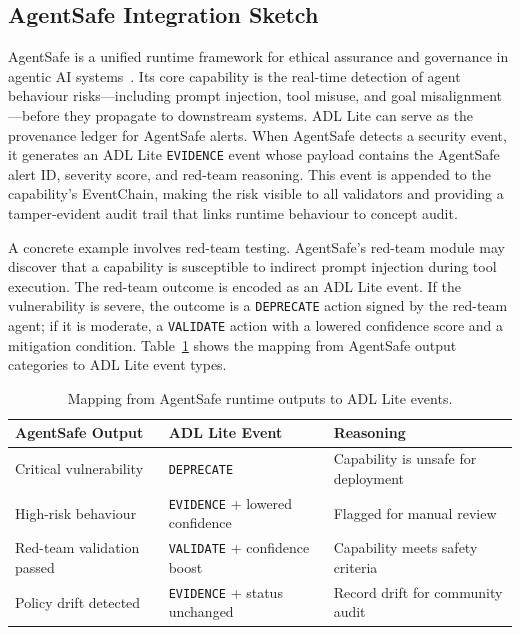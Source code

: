 \subsection{AgentSafe Integration Sketch}
\label{subsec:agentsafe-integration}

AgentSafe is a unified runtime framework for ethical assurance and governance in agentic AI systems~\cite{agentsafe2025}. Its core capability is the real-time detection of agent behaviour risks---including prompt injection, tool misuse, and goal misalignment---before they propagate to downstream systems. ADL Lite can serve as the provenance ledger for AgentSafe alerts. When AgentSafe detects a security event, it generates an ADL Lite \texttt{EVIDENCE} event whose payload contains the AgentSafe alert ID, severity score, and red-team reasoning. This event is appended to the capability's EventChain, making the risk visible to all validators and providing a tamper-evident audit trail that links runtime behaviour to concept audit.

A concrete example involves red-team testing. AgentSafe's red-team module may discover that a capability is susceptible to indirect prompt injection during tool execution. The red-team outcome is encoded as an ADL Lite event. If the vulnerability is severe, the outcome is a \texttt{DEPRECATE} action signed by the red-team agent; if it is moderate, a \texttt{VALIDATE} action with a lowered confidence score and a mitigation condition. Table~\ref{tab:agentsafe-mapping} shows the mapping from AgentSafe output categories to ADL Lite event types.

\begin{table}[htbp]
\centering
\caption{Mapping from AgentSafe runtime outputs to ADL Lite events.}
\label{tab:agentsafe-mapping}
\begin{tabular}{@{}lll@{}}
\toprule
\textbf{AgentSafe Output} & \textbf{ADL Lite Event} & \textbf{Reasoning} \\
\midrule
Critical vulnerability & \texttt{DEPRECATE} & Capability is unsafe for deployment \\
High-risk behaviour & \texttt{EVIDENCE} + lowered confidence & Flagged for manual review \\
Red-team validation passed & \texttt{VALIDATE} + confidence boost & Capability meets safety criteria \\
Policy drift detected & \texttt{EVIDENCE} + status unchanged & Record drift for community audit \\
\bottomrule
\end{tabular}
\end{table}
